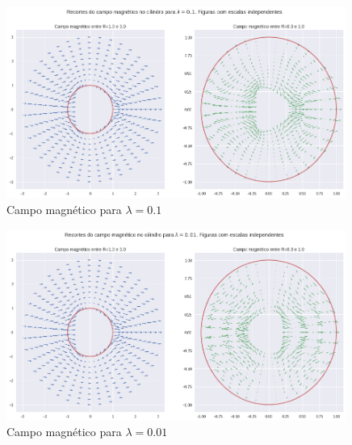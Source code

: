 \documentclass[%
 reprint,
 amsmath,amssymb,
 aps,
]{revtex4-1}
\begin{document}
\begin{figure}[h]
    \caption{Campo magnético para $\lambda=0.1$}
    \includegraphics[width=0.99\textwidth]{lambda_01.png}
\end{figure}

\begin{figure}[h]
    \caption{Campo magnético para $\lambda=0.01$}
    \includegraphics[width=0.99\textwidth]{lambda_001.png}
\end{figure}
\end{document}
